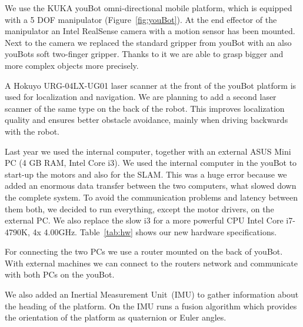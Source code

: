 We use the KUKA youBot omni-directional mobile platform, which is equipped with a 5 DOF manipulator (Figure~\ref{fig:youBot}). At the end effector of the manipulator an Intel RealSense camera with a motion sensor has been mounted. Next to the camera we replaced the standard gripper from youBot with an also youBots soft two-finger gripper. Thanks to it we are able to grasp bigger and more complex objects more precisely.

A Hokuyo URG-04LX-UG01 laser scanner at the front of the youBot platform is used for localization and navigation. We are planning to add a second laser scanner of the same type on the back of the robot. This improves localization quality and ensures better obstacle avoidance, mainly when driving backwards with the robot.

Last year we used the internal computer, together with an external ASUS Mini PC (4 GB RAM, Intel Core i3). We used the internal computer in the youBot to start-up the motors and also for the SLAM. This was a huge error because we added an enormous data transfer between the two computers, what slowed down the complete system. To avoid the communication problems and latency between them both, we decided to run everything, except the motor drivers, on the external PC. We also replace the slow i3 for a more powerful CPU Intel Core i7-4790K, 4x 4.00GHz. Table~\ref{tab:hw} shows our new hardware specifications. 

For connecting the two PCs we use a router mounted on the back of youBot. With external machines we can connect to the routers network and communicate with both PCs on the youBot.

We also added an Inertial Measurement Unit~(IMU) to gather information about the heading of the platform. On the IMU runs a fusion algorithm which provides the orientation of the platform as quaternion or Euler angles.

